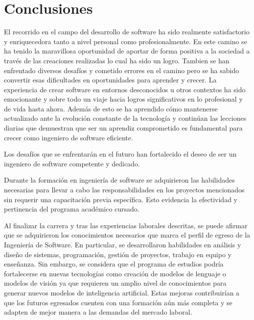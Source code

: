 \documentclass[protocolo.tex]{subfiles}
\begin{document}
\section{Conclusiones}
El recorrido en el campo del desarrollo de software ha sido realmente
satisfactorio y enriquecedora tanto a nivel personal como profesionalmente. 
En este camino se ha tenido la maravillosa oportunidad de aportar de forma 
positiva a la sociedad a través de las creaciones realizadas lo cual ha sido un logro.
Tambien se han enfrentado diversos desafíos y cometido errores en el camino pero se ha sabido convertir esas dificultades
en oportunidades para aprender y crecer. La experiencia de crear software en entornos desconocidos u otros contextos ha sido 
emocionante y sobre todo un viaje hacia logros significativos en lo profesional y de vida hasta ahora. Además de esto se ha aprendido cómo mantenerse actualizado ante la evolución constante de la tecnología y continúan las lecciones diarias que demuestran que ser un aprendiz comprometido es fundamental para crecer como ingeniero de software eficiente.

Los desafíos que se enfrentarán en el futuro han fortalecido el deseo de ser un ingeniero de software competente y dedicado.

Durante la formación en ingeniería de software se adquirieron las habilidades necesarias para llevar a cabo las responsabilidades en los proyectos mencionados sin requerir una capacitación previa específica. Esto evidencia la efectividad y pertinencia del programa académico cursado.

Al finalizar la carrera y tras las experiencias laborales descritas, se puede afirmar que se  adquirieron los conocimientos necesarios que marca el perfil de egreso de la Ingeniería de Software. En particular, 
se desarrollaron habilidades en análisis y diseño de sistemas, programación, gestión de proyectos, trabajo en equipo y enseñanza. Sin embargo, se considera que el programa de estudios podría fortalecerse en nuevas tecnologías como creación de modelos de lenguaje o modelos de visión ya que requieren un amplio nivel de conocimientos para generar nuevos modelos de inteligencia artificial.  Estas mejoras contribuirían a que los futuros egresados cuenten con una formación aún más completa y se adapten de mejor manera a las demandas del mercado laboral.
\end{document}
